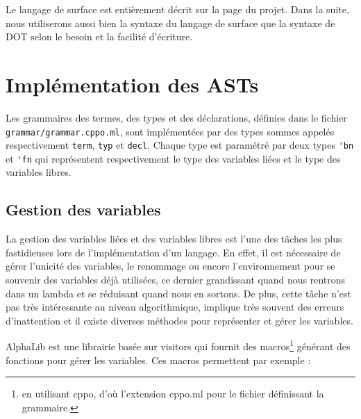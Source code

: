 Le langage de surface est entièrement décrit sur la page du
projet\cite{rml-github}. Dans la suite, nous
utiliserons aussi bien la syntaxe du langage de surface que la syntaxe de DOT
selon le besoin et la facilité d'écriture.

\section{Implémentation des ASTs}

Les grammaires des termes, des types et des déclarations, définies dans le
fichier \verb|grammar/grammar.cppo.ml|, sont implémentées par des types sommes
appelés respectivement \verb|term|, \verb|typ| et \verb|decl|. Chaque type est
paramétré par deux types \verb|'bn| et \verb|'fn| qui représentent
respectivement le type des variables liées et le type des variables libres.

\subsection*{Gestion des variables}

La gestion des variables liées et des variables libres est l'une des tâches les plus
fastidieuses lors de l'implémentation d'un langage. En effet, il
est nécessaire de gérer l'unicité des variables, le renommage ou encore l'environnement
pour se souvenir des variables déjà utilisées, ce dernier grandissant quand nous
rentrons dans un lambda et se réduisant quand nous en sortons. De plus,
cette tâche n'est pas très intéressante au niveau algorithmique, implique très
souvent des erreurs d'inattention et il existe diverses méthodes pour
représenter et gérer les variables.

AlphaLib\cite{alphalib} est une librairie basée sur
visitors\cite{visitors} qui fournit des macros\footnote{en utilisant
  cppo, d'où l'extension cppo.ml pour le fichier définissant la grammaire.}
générant des fonctions pour gérer les variables. Ces macros permettent par
exemple :

